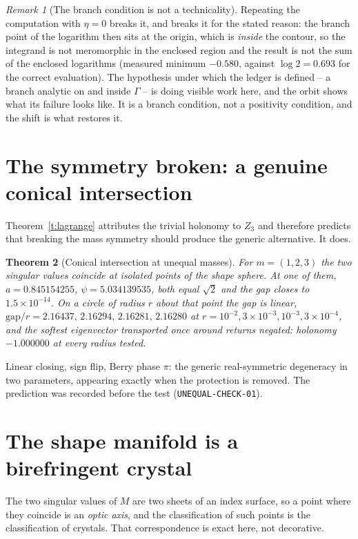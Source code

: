 \documentclass[11pt]{article}
\newtheorem{theorem}{Theorem}
\theoremstyle{remark}
\newtheorem{remark}[theorem]{Remark}
\begin{document}
\begin{remark}[The branch condition is not a technicality]
Repeating the computation with $\eta=0$ breaks it, and breaks it for the stated reason: the
branch point of the logarithm then sits at the origin, which is \emph{inside} the contour,
so the integrand is not meromorphic in the enclosed region and the result is not the sum of
the enclosed logarithms (measured minimum $-0.580$, against $\log2=0.693$ for the correct
evaluation). The hypothesis under which the ledger is defined -- a branch analytic on and
inside $\Gamma$ -- is doing visible work here, and the orbit shows what its failure looks
like. It is a branch condition, not a positivity condition, and the shift is what restores
it.
\end{remark}


\section{The symmetry broken: a genuine conical intersection}

Theorem~\ref{t:lagrange} attributes the trivial holonomy to $Z_3$ and therefore predicts
that breaking the mass symmetry should produce the generic alternative. It does.

\begin{theorem}[Conical intersection at unequal masses]\label{t:conical}
For $m=(1,2,3)$ the two singular values coincide at isolated points of the shape sphere.
At one of them, $a=0.845154255$, $\psi=5.034139535$, both equal $\sqrt2$ and the gap closes
to $1.5\times10^{-14}$. On a circle of radius $r$ about that point the gap is
\emph{linear}, $\mathrm{gap}/r = 2.16437,\,2.16294,\,2.16281,\,2.16280$ at
$r=10^{-2},3\times10^{-3},10^{-3},3\times10^{-4}$, and the softest eigenvector transported
once around returns \emph{negated}: holonomy $-1.000000$ at every radius tested.
\end{theorem}

\noindent
Linear closing, sign flip, Berry phase $\pi$: the generic real-symmetric degeneracy in two
parameters, appearing exactly when the protection is removed. The prediction was recorded
before the test (\texttt{UNEQUAL-CHECK-01}).

\section{The shape manifold is a birefringent crystal}

The two singular values of $M$ are two sheets of an index surface, so a point where they
coincide is an \emph{optic axis}, and the classification of such points is the
classification of crystals. That correspondence is exact here, not decorative.
\end{document}
